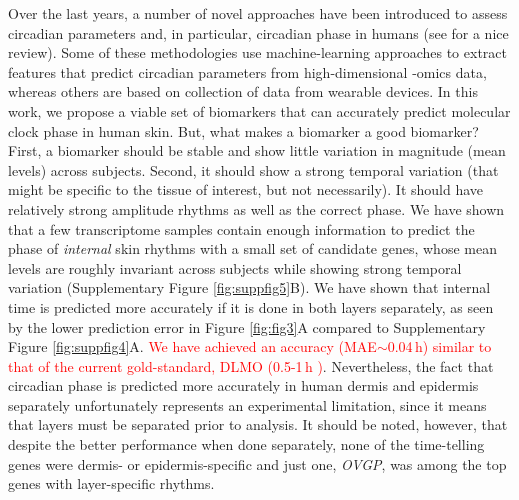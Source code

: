 Over the last years, a number of novel approaches have been introduced to assess circadian parameters and, in particular, circadian phase in humans (see \cite{Dijk2020} for a nice review). Some of these methodologies use machine-learning approaches to extract features that predict circadian parameters from high-dimensional -omics data, whereas others are based on collection of data from wearable devices. In this work, we propose a viable set of biomarkers that can accurately predict molecular clock phase in human skin. But, what makes a biomarker a good biomarker? First, a biomarker should be stable and show little variation in magnitude (mean levels) across subjects. Second, it should show a strong temporal variation (that might be specific to the tissue of interest, but not necessarily). It should have relatively strong amplitude rhythms as well as the correct phase. We have shown that a few transcriptome samples contain enough information to predict the phase of \textit{internal} skin rhythms with a small set of candidate genes, whose mean levels are roughly invariant across subjects while showing strong temporal variation (Supplementary Figure \ref{fig:suppfig5}B). We have shown that internal time is predicted more accurately if it is done in both layers separately, as seen by the lower prediction error in Figure \ref{fig:fig3}A compared to Supplementary Figure \ref{fig:suppfig4}A. \textcolor{red}{We have achieved an accuracy (MAE$\sim$0.04\,h) similar to that of the current gold-standard, DLMO (0.5-1\,h \cite{Klerman2002, Danilenko2014})}. Nevertheless, the fact that circadian phase is predicted more accurately in human dermis and epidermis separately unfortunately represents an experimental limitation, since it means that layers must be separated prior to analysis. It should be noted, however, that despite the better performance when done separately, none of the time-telling genes were dermis- or epidermis-specific and just one, \textit{OVGP}, was among the top genes with layer-specific rhythms. \\%


